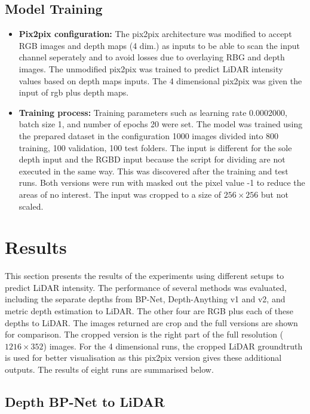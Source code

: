 \subsection{Model Training}\label{modeltraining}
\begin{itemize}
	\item \textbf{Pix2pix configuration:} The pix2pix architecture was modified to accept RGB images and depth maps (4 dim.) as inputs to be able to scan the input channel seperately and to avoid losses due to overlaying RBG and depth images. The unmodified pix2pix was trained to predict LiDAR intensity values based on depth maps inputs. The 4 dimensional pix2pix was given the input of rgb plus depth maps.
	\item \textbf{Training process:} Training parameters such as learning rate 0.0002000, batch size 1, and number of epochs 20 were set. The model was trained using the prepared dataset in the configuration 1000 images divided into 800 training, 100 validation, 100 test folders. The input is different for the sole depth input and the RGBD input because the script for dividing are not executed in the same way. This was discovered after the training and test runs. Both versions were run with masked out the pixel value -1 to reduce the areas of no interest. The input was cropped to a size of $256 \times 256$  but not scaled.
\end{itemize}

\section{Results} \label{results}

This section presents the results of the experiments using different setups to predict LiDAR intensity. The performance of several methods was evaluated, including the separate depths from BP-Net, Depth-Anything v1 and v2, and metric depth estimation to LiDAR. The other four are RGB plus each of these depths to LiDAR. The images returned are crop and the full versions are shown for comparison. The cropped version is the right part of the full resolution ($1216 \times 352$) images. For the 4 dimensional runs, the cropped LiDAR groundtruth is used for better visualisation as this pix2pix version gives these additional outputs. The results of eight runs are summarised below.
\subsection{Depth BP-Net to LiDAR}

